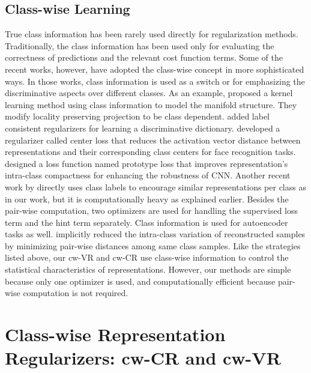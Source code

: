 \subsection{Class-wise Learning}
True class information has been rarely used directly for regularization methods.
Traditionally, the class information has been used only for evaluating the correctness of
predictions and the relevant cost function terms. Some of the recent works, however, 
have adopted the class-wise concept in more sophisticated ways. In those works, 
class information is used as a switch or for emphasizing the discriminative aspects over different classes. 
%
As an example, \cite{li2008kernel} proposed a kernel learning method using class information to model the manifold structure. They modify locality preserving projection to be class dependent. \cite{jiang2011learning} 
added label consistent regularizers for learning a discriminative dictionary. 
%
\cite{wen2016discriminative} developed a regularizer called center loss that reduces the activation vector distance between representations and their corresponding class centers for face recognition tasks.
%
\cite{yang2018robust} designed a loss function named prototype loss that improves representation's intra-class compactness for enhancing the robustness of CNN.
%
Another recent work by \cite{belharbi2017neural} directly uses class labels to encourage similar representations per class as in our work, but it is computationally heavy as explained earlier.  
Besides the pair-wise computation, two optimizers are used for handling the supervised loss term and the hint term separately. 
%
Class information is used for autoencoder tasks as well. \cite{shi2016learning} implicitly reduced the intra-class variation of reconstructed samples by minimizing pair-wise distances among same class samples.
%
Like the strategies listed above, our cw-VR and cw-CR use class-wise information to control the statistical characteristics of representations. However, our methods are simple because only one optimizer is used, and computationally efficient because pair-wise computation is not required.



\section{Class-wise Representation Regularizers: cw-CR and cw-VR}


